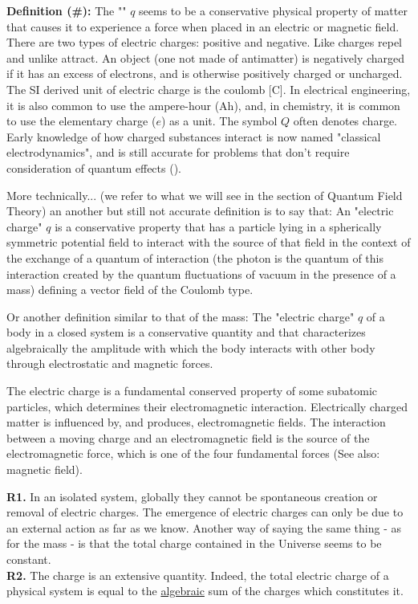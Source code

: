 	\textbf{Definition (\#\mydef):} The "" $q$ seems to be a conservative physical property of matter that causes it to experience a force when placed in an electric or magnetic field. There are two types of electric charges: positive and negative. Like charges repel and unlike attract. An object (one not made of antimatter) is negatively charged if it has an excess of electrons, and is otherwise positively charged or uncharged. The SI derived unit of electric charge is the coulomb [C]. In electrical engineering, it is also common to use the ampere-hour (Ah), and, in chemistry, it is common to use the elementary charge ($e$) as a unit. The symbol $Q$ often denotes charge. Early knowledge of how charged substances interact is now named "classical electrodynamics", and is still accurate for problems that don't require consideration of quantum effects ().
	
	More technically... (we refer to what we will see in the section of Quantum Field Theory) an another but still not accurate definition is to say that: An "electric charge" $q$ is a conservative property that has a particle lying in a spherically symmetric potential field to interact with the source of that field in the context of the exchange of a quantum of interaction (the photon is the quantum of this interaction created by the quantum fluctuations of vacuum in the presence of a mass) defining a vector field of the Coulomb type.
	
	Or another definition similar to that of the mass: The "electric charge" $q$ of a body in a closed system is a conservative quantity and that characterizes algebraically the amplitude with which the body interacts with other body through electrostatic and magnetic forces.

	The electric charge is a fundamental conserved property of some subatomic particles, which determines their electromagnetic interaction. Electrically charged matter is influenced by, and produces, electromagnetic fields. The interaction between a moving charge and an electromagnetic field is the source of the electromagnetic force, which is one of the four fundamental forces (See also: magnetic field).
	
	\begin{tcolorbox}[title=Remarks,colframe=black,arc=10pt]
	\textbf{R1.} In an isolated system, globally they cannot be  spontaneous creation or removal of electric charges. The emergence of electric charges can only be due to an external action as far as we know. Another way of saying the same thing - as for the mass - is that the total charge contained in the Universe seems to be constant.\\
		
	\textbf{R2.} The charge is an extensive quantity. Indeed, the total electric charge of a physical system is equal to the \underline{algebraic} sum of the charges which constitutes it.
	\end{tcolorbox}

